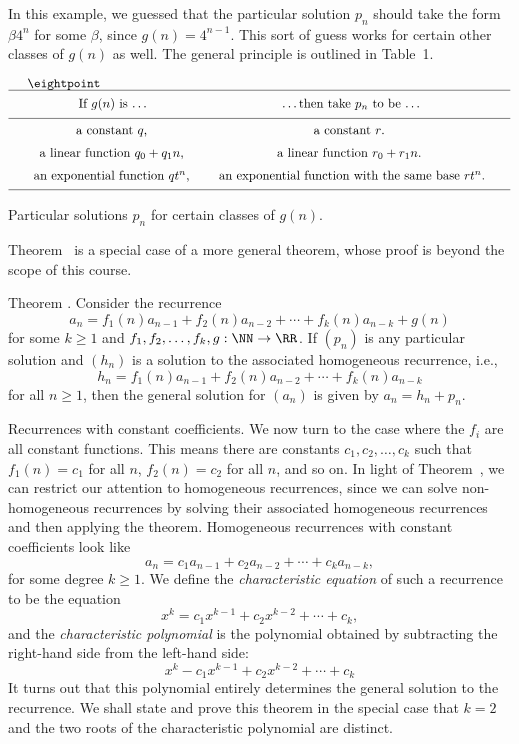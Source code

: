 In this example, we guessed that the particular solution
$p_n$ should take the form $\beta 4^n$ for some $\beta$, since $g(n) = 4^{n-1}$. This sort of
guess works for certain other classes of $g(n)$ as well. The general principle is outlined in Table~1.

\topinsert
$$\vcenter{\vbox{
\eightpoint
\tabskip=2em plus2em minus.5em
\halign{
\hfil#\hfil & \hfil#\hfil \cr
\noalign{\hrule}
\noalign{\medskip}
If $g(n)$ is \dots & \dots then take $p_n$ to be \dots \cr
\noalign{\medskip}
\noalign{\hrule}
\noalign{\medskip}
a constant $q$, & a constant $r$. \cr
\noalign{\medskip}
a linear function $q_0 + q_1n$, & a linear function $r_0 + r_1 n$. \cr
\noalign{\medskip}
an exponential function $qt^n$, & an exponential function with the same base $rt^n$.\cr
\noalign{\medskip}
\noalign{\hrule}
}
}}$$
\vskip5pt
{\centerline{Particular solutions $p_n$ for certain classes of $g(n)$.}}
\bigskip
\endinsert\goodbreak

Theorem~{\thmnonhomoone} is a special case of a more general theorem, whose proof is beyond the
scope of this course.

\edef\thmnonhomo{\the\thmcount}
\proclaim Theorem \advthm. Consider the recurrence
$$ a_n = f_1(n) a_{n-1} + f_2(n)a_{n-2} + \cdots + f_k(n) a_{n-k} + g(n)$$
for some $k\ge 1$ and $f_1, f_2,\ldots, f_k,g : \NN\to \RR$. If $(p_n)$ is any particular solution
and $(h_n)$ is a solution to the associated homogeneous recurrence, i.e.,
$$h_n = f_1(n) a_{n-1} + f_2(n)a_{n-2} + \cdots + f_k(n) a_{n-k}$$
for all $n\ge 1$, then the general solution for $(a_n)$ is given by $a_n = h_n + p_n$.\slug

\medskip\boldlabel Recurrences with constant coefficients.
We now turn to the case where the $f_i$ are all constant functions. This means
there are constants $c_1, c_2, \ldots, c_k$ such that $f_1(n) = c_1$ for all $n$,
$f_2(n) = c_2$ for all $n$, and so on.
In light of Theorem~{\thmnonhomo}, we can
restrict our attention to homogeneous recurrences, since we can solve non-homogeneous
recurrences by solving their associated homogeneous recurrences and then applying the theorem.
Homogeneous recurrences with constant coefficients look like
$$a_n = c_1 a_{n-1} + c_2 a_{n-2} + \cdots + c_k a_{n-k},$$
for some degree $k\ge 1$. We define the {\it characteristic equation} of such a recurrence to be the
equation
$$x^k = c_1 x^{k-1} + c_2 x^{k-2} + \cdots + c_k,$$
and the {\it characteristic polynomial} is the polynomial obtained by subtracting
the right-hand side from the left-hand side:
$$x^k - c_1 x^{k-1} + c_2 x^{k-2} + \cdots + c_k$$
It turns out that this
polynomial entirely determines the general solution to the recurrence. We shall state
and prove this theorem in the special case that $k=2$ and the two roots of the characteristic
polynomial are distinct.

